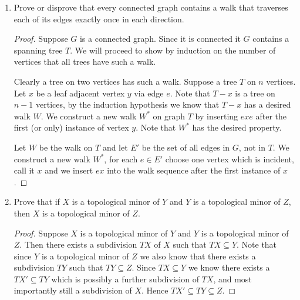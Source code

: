 \documentclass[12pt]{article}
\begin{document}
\begin{enumerate}
	\begin{proof}$(\leftarrow)$ Suppose $G$ is not bipartite. Then by Proposition 1.6.1 and the previous problem there exists an smallest induced odd cycle $C_{2n+1}$. Pick $x$ and $y$ incident in said cycle and note that there exists a $v$ on the cycle a distance of $n$ away from both $x$ and $y$. There is no shorter path between vertices $x, y$ and $v$ in $G$ as $C_{2n+1}$ was induced and chosen to be the smallest. 
		For clarity, suppose there exist a shorter path $xPv$ in $G$, not on the cycle. Then up to parity of paths either $xC_{2n+1}vPx$ forms a smaller odd cycle, or $xyC_{2n+1}vPx$ forms a smaller cycle. 
	\end{proof}
	\newpage


	\item Prove or disprove that every connected graph contains a walk that traverses each of its edges exactly once in each direction. 
	\begin{proof} Suppose $G$ is a connected graph. Since it is connected it $G$ contains a spanning tree $T$. We will proceed to show by induction on the number of vertices that all trees have such a walk. 

		Clearly a tree on two vertices has such a walk. Suppose a tree $T$ on $n$ vertices. 
		Let $x$ be a leaf adjacent vertex $y$ via edge $e$. Note that $T - x$ is a tree on $n - 1$ vertices, by the induction hypothesis we know that $T - x$ has a desired walk $W$. We construct a new walk $W^*$ on graph $T$ by inserting $exe$ after the first (or only) instance of vertex $y$. Note that $W^*$ has the desired property.   

	Let $W$ be the walk on $T$ and let $E'$ be the set of all edges in $G$, not in $T$. 
	We construct a new walk $W^*$, for each $e \in E'$ choose one vertex which is incident, call it $x$ and we insert $ex$ into the walk sequence after the first instance of $x$. 
 
	\end{proof}
	\newpage

	

	\item  Prove that if $X$ is a topological minor of $Y$ and $Y$ is a topological minor of $Z$, then $X$ is a topological minor of $Z$. 
	\begin{proof} Suppose $X$ is a topological minor of $Y$ and $Y$ is a topological minor of $Z$. Then there exists a subdivision $TX$ of $X$ such that $TX \subseteq Y$. Note that since $Y$ is a topological minor of $Z$ we also know that there exists a subdivision $TY$ such that $TY \subseteq Z$. Since $TX \subseteq Y$ we know there exists a $TX' \subseteq TY$ which is possibly a further subdivision of $TX$, and most importantly still a subdivision of $X$. Hence $TX' \subseteq TY \subseteq Z$. 
 	\end{proof}
	\newpage



\end{enumerate}
\end{document}
